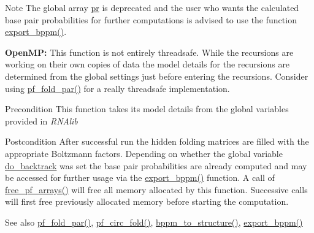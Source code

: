 \begin{DoxyNote}{Note}
The global array \mbox{\hyperlink{fold__vars_8h_ac98ec419070aee6831b44e5c700f090f}{pr}} is deprecated and the user who wants the calculated base pair probabilities for further computations is advised to use the function \mbox{\hyperlink{group__pf__fold_gac5ac7ee281aae1c5cc5898a841178073}{export\+\_\+bppm()}}. 

{\bfseries Open\+MP\+:} This function is not entirely threadsafe. While the recursions are working on their own copies of data the model details for the recursions are determined from the global settings just before entering the recursions. Consider using \mbox{\hyperlink{group__pf__fold_gac4f95bee734b2563a3d6e9932117ebdf}{pf\+\_\+fold\+\_\+par()}} for a really threadsafe implementation. 
\end{DoxyNote}
\begin{DoxyPrecond}{Precondition}
This function takes its model details from the global variables provided in {\itshape R\+N\+Alib} 
\end{DoxyPrecond}
\begin{DoxyPostcond}{Postcondition}
After successful run the hidden folding matrices are filled with the appropriate Boltzmann factors. Depending on whether the global variable \mbox{\hyperlink{group__model__details_gad512b5dd4dbec60faccfe137bb474489}{do\+\_\+backtrack}} was set the base pair probabilities are already computed and may be accessed for further usage via the \mbox{\hyperlink{group__pf__fold_gac5ac7ee281aae1c5cc5898a841178073}{export\+\_\+bppm()}} function. A call of \mbox{\hyperlink{group__pf__fold_gae73db3f49a94f0f72e067ecd12681dbd}{free\+\_\+pf\+\_\+arrays()}} will free all memory allocated by this function. Successive calls will first free previously allocated memory before starting the computation. 
\end{DoxyPostcond}
\begin{DoxySeeAlso}{See also}
\mbox{\hyperlink{group__pf__fold_gac4f95bee734b2563a3d6e9932117ebdf}{pf\+\_\+fold\+\_\+par()}}, \mbox{\hyperlink{group__pf__fold_ga819ce5fca8984004ac81c4a3b04cb735}{pf\+\_\+circ\+\_\+fold()}}, \mbox{\hyperlink{group__struct__utils_ga129d81c4a1ead793c5b2311333e03dfa}{bppm\+\_\+to\+\_\+structure()}}, \mbox{\hyperlink{group__pf__fold_gac5ac7ee281aae1c5cc5898a841178073}{export\+\_\+bppm()}} 
\end{DoxySeeAlso}


